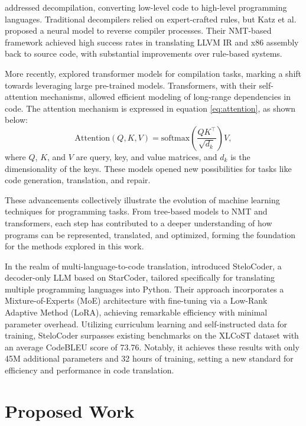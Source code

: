 \documentclass{dhbenelux}
\begin{document}
\cite{katz2019}addressed decompilation, converting low-level code to high-level programming languages. Traditional decompilers relied on expert-crafted rules, but Katz et al. proposed a neural model to reverse compiler processes. Their NMT-based framework achieved high success rates in translating LLVM IR and x86 assembly back to source code, with substantial improvements over rule-based systems. 

More recently, \cite{xiyu2024} explored transformer models for compilation tasks, marking a shift towards leveraging large pre-trained models. Transformers, with their self-attention mechanisms, allowed efficient modeling of long-range dependencies in code. The attention mechanism is expressed in equation \ref{eq:attention}, as shown below:
\begin{equation}
\text{Attention}(Q, K, V) = \text{softmax}\left(\frac{QK^\top}{\sqrt{d_k}}\right)V,
\label{eq:attention}
\end{equation}
where \( Q \), \( K \), and \( V \) are query, key, and value matrices, and \( d_k \) is the dimensionality of the keys. These models opened new possibilities for tasks like code generation, translation, and repair.



These advancements collectively illustrate the evolution of machine learning techniques for programming tasks. From tree-based models to NMT and transformers, each step has contributed to a deeper understanding of how programs can be represented, translated, and optimized, forming the foundation for the methods explored in this work.

In the realm of multi-language-to-code translation, \cite{pan2023} introduced SteloCoder, a decoder-only LLM based on StarCoder, tailored specifically for translating multiple programming languages into Python. Their approach incorporates a Mixture-of-Experts (MoE) architecture with fine-tuning via a Low-Rank Adaptive Method (LoRA), achieving remarkable efficiency with minimal parameter overhead. Utilizing curriculum learning and self-instructed data for training, SteloCoder surpasses existing benchmarks on the XLCoST dataset \cite{xlcost2022} with an average CodeBLEU score of 73.76. Notably, it achieves these results with only 45M additional parameters and 32 hours of training, setting a new standard for efficiency and performance in code translation.

\section{Proposed Work}
\end{document}
